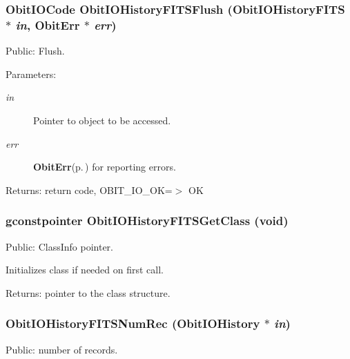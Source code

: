 \subsubsection{\setlength{\rightskip}{0pt plus 5cm}Obit\-IOCode Obit\-IOHistory\-FITSFlush ({\bf Obit\-IOHistory\-FITS} $\ast$ {\em in}, {\bf Obit\-Err} $\ast$ {\em err})}\label{ObitIOHistoryFITS_8h_a16}


Public: Flush. 

\begin{Desc}
\item[Parameters:]
\begin{description}
\item[{\em in}]Pointer to object to be accessed. \item[{\em err}]{\bf Obit\-Err}{\rm (p.\,\pageref{structObitErr})} for reporting errors. \end{description}
\end{Desc}
\begin{Desc}
\item[Returns:]return code, OBIT\_\-IO\_\-OK=$>$ OK \end{Desc}
\subsubsection{\setlength{\rightskip}{0pt plus 5cm}gconstpointer Obit\-IOHistory\-FITSGet\-Class (void)}\label{ObitIOHistoryFITS_8h_a7}


Public: Class\-Info pointer. 

Initializes class if needed on first call. \begin{Desc}
\item[Returns:]pointer to the class structure. \end{Desc}
\subsubsection{ Obit\-IOHistory\-FITSNum\-Rec ({\bf Obit\-IOHistory} $\ast$ {\em in})}\label{ObitIOHistoryFITS_8h_a19}


Public: number of records. 

